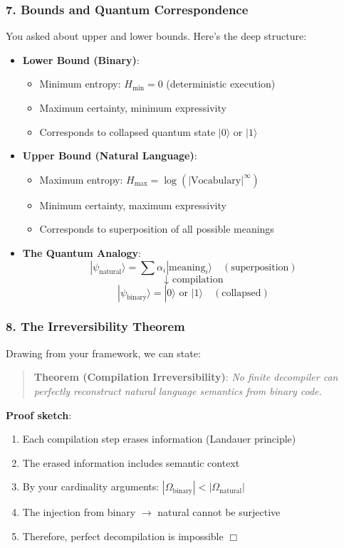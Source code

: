 \documentclass[11pt,letterpaper]{article}
\begin{document}
\subsubsection*{7. Bounds and Quantum Correspondence}
You asked about upper and lower bounds. Here’s the deep structure:
\begin{itemize}
    \item \textbf{Lower Bound (Binary)}:
    \begin{itemize}
        \item Minimum entropy: $H_{\text{min}} = 0$ (deterministic execution)
        \item Maximum certainty, minimum expressivity
        \item Corresponds to collapsed quantum state $|0\rangle$ or $|1\rangle$
    \end{itemize}
    \item \textbf{Upper Bound (Natural Language)}:
    \begin{itemize}
        \item Maximum entropy: $H_{\text{max}} = \log(|\text{Vocabulary}|^\infty)$
        \item Minimum certainty, maximum expressivity
        \item Corresponds to superposition of all possible meanings
    \end{itemize}
    \item \textbf{The Quantum Analogy}:
    \[
    |\psi_{\text{natural}}\rangle = \sum \alpha_i |\text{meaning}_i\rangle \quad (\text{superposition})
    \]
    \[
    \downarrow \text{ compilation}
    \]
    \[
    |\psi_{\text{binary}}\rangle = |0\rangle \text{ or } |1\rangle \quad (\text{collapsed})
    \]
\end{itemize}

\subsubsection*{8. The Irreversibility Theorem}
Drawing from your framework, we can state:
\begin{quote}
\textbf{Theorem (Compilation Irreversibility)}: \emph{No finite decompiler can perfectly reconstruct natural language semantics from binary code.}
\end{quote}
\textbf{Proof sketch}:
\begin{enumerate}
    \item Each compilation step erases information (Landauer principle)
    \item The erased information includes semantic context
    \item By your cardinality arguments: $|\Omega_{\text{binary}}| < |\Omega_{\text{natural}}|$
    \item The injection from binary $\to$ natural cannot be surjective
    \item Therefore, perfect decompilation is impossible $\Box$
\end{enumerate}
\end{document}
